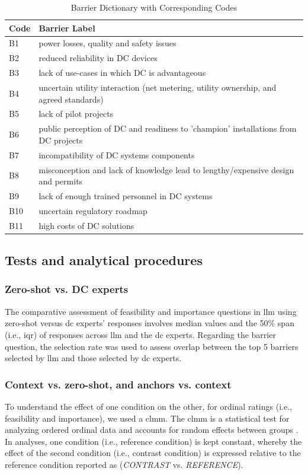 \documentclass[manuscript,review,anonymous]{acmart}
\begin{document}
\begin{table}[h!]
  \caption{Barrier Dictionary with Corresponding Codes}
  \label{tab:barrier_dictionary}
  \centering
  \begin{tabular}{@{} l p{} @{}}
    \toprule
    \textbf{Code} & \textbf{Barrier Label} \\
    \midrule
    B1  & power losses, quality and safety issues \\
    B2  & reduced reliability in DC devices \\
    B3  & lack of use-cases in which DC is advantageous \\
    B4  & uncertain utility interaction (net metering, utility ownership, and agreed standards) \\
    B5  & lack of pilot projects \\
    B6  & public perception of DC and readiness to 'champion' installations from DC projects \\
    B7  & incompatibility of DC systems components \\
    B8  & misconception and lack of knowledge lead to lengthy/expensive design and permits \\
    B9  & lack of enough trained personnel in DC systems \\
    B10 & uncertain regulatory roadmap \\
    B11 & high costs of DC solutions \\
    \bottomrule
  \end{tabular}
\end{table}

\subsection{Tests and analytical procedures}

\subsubsection{Zero-shot vs. DC experts}
The comparative assessment of feasibility and importance questions in \gls{llm} using zero-shot versus \gls{dc} experts' responses involves median values and the 50\% span (i.e., \gls{iqr}) of responses across \gls{llm} and the \gls{dc} experts. Regarding the barrier question, the selection rate was used to assess overlap between the top 5 barriers selected by \gls{llm} and those selected by \gls{dc} experts.

\subsubsection{Context vs. zero-shot, and anchors vs. context}
To understand the effect of one condition on the other, for ordinal ratings (i.e., feasibility and importance), we used a \gls{clmm}. The \gls{clmm} is a statistical test for analyzing ordered ordinal data and accounts for random effects between groups \cite{chen2020CLMM, peng2024CLMM}.  
In analyses, one condition (i.e., reference condition) is kept constant, whereby the effect of the second condition (i.e., contrast condition) is expressed relative to the reference condition reported as (\textit{CONTRAST} vs. \textit{REFERENCE}).
\end{document}
